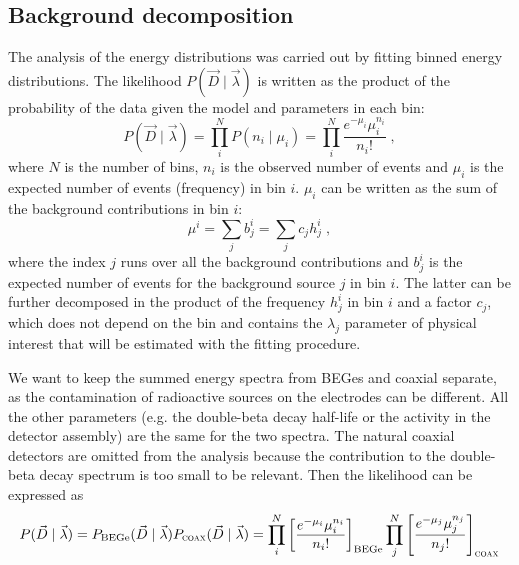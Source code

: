 \subsection*{Background decomposition}
The analysis of the energy distributions was carried out by fitting binned energy distributions. The likelihood $P(\vec{D}\mid\vec{\lambda})$ is written as the product of the probability of the data given the model and parameters in each bin:
\begin{equation}P(\vec{D}\mid\vec{\lambda})=\prod_i^{N}P(n_i\mid\mu_i)=\prod_i^N\frac{e^{-\mu_i}\mu_i^{n_i}}{n_i!}\;,\end{equation}
where $N$ is the number of bins, $n_i$ is the observed number of events and $\mu_i$ is the expected number of events (frequency) in bin $i$. $\mu_i$ can be written as the sum of the background contributions in bin $i$:
\begin{equation}\mu^i=\sum_jb_j^i=\sum_j c_jh_j^i\;,\end{equation}
where the index $j$ runs over all the background contributions and $b_j^i$ is the expected number of events for the background source $j$ in bin $i$. The latter can be further decomposed in the product of the frequency $h_j^i$ in bin $i$ and a factor $c_j$, which does not depend on the bin and contains the $\lambda_j$ parameter of physical interest that will be estimated with the fitting procedure.

We want to keep the summed energy spectra from BEGes and coaxial separate, as the contamination of radioactive sources on the electrodes can be different. All the other parameters (e.g. the double-beta decay half-life or the  activity in the detector assembly) are the same for the two spectra. The natural coaxial detectors are omitted from the analysis because the contribution to the double-beta decay spectrum is too small to be relevant. Then the likelihood can be expressed as
\begin{equation}P(\vec{D}\mid\vec{\lambda})=P_\text{BEGe}(\vec{D}\mid\vec{\lambda})P_\textsc{coax}(\vec{D}\mid\vec{\lambda})=\prod_i^N\left[\frac{e^{-\mu_i}\mu_i^{n_i}}{n_i!}\right]_\text{BEGe}\prod_j^N\left[\frac{e^{-\mu_j}\mu_j^{n_j}}{n_j!}\right]_\textsc{coax}\end{equation}

